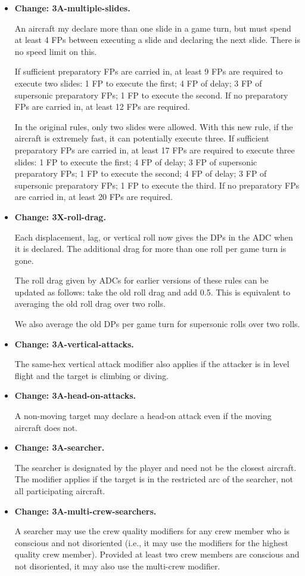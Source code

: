 \documentclass[10pt]{report}
\newcommand{\itemtag}[1]{\item \textbf{Change: #1.}\par}
\begin{document}
\begin{itemize}
    \itemtag{3A-multiple-slides} An aircraft my declare more than one slide in a game turn, but must spend at least 4 FPs between executing a slide and declaring the next slide. There is no speed limit on this.
    
    If sufficient preparatory FPs are carried in, at least 9 FPs are required to execute two slides: 1 FP to execute the first; 4 FP of delay; 3 FP of supersonic preparatory FPs; 1 FP to execute the second. If no preparatory FPs are carried in, at least 12 FPs are required.

    In the original rules, only two slides were allowed. With this new rule, if the aircraft is extremely fast, it can potentially execute three. If sufficient preparatory FPs are carried in, at least 17 FPs are required to execute three slides: 1 FP to execute the first; 4 FP of delay; 3 FP of supersonic preparatory FPs; 1 FP to execute the second; 4 FP of delay; 3 FP of supersonic preparatory FPs; 1 FP to execute the third. If no preparatory FPs are carried in, at least 20 FPs are required. 

    \itemtag{3X-roll-drag} Each displacement, lag, or vertical roll now gives the DPs in the ADC when it is declared. The additional drag for more than one roll per game turn is gone.
    
    The roll drag given by ADCs for earlier versions of these rules can be updated as follows: take the old roll drag and add 0.5. This is equivalent to averaging the old roll drag over two rolls.
    
    We also average the old DPs per game turn for supersonic rolls over two rolls.

    \itemtag{3A-vertical-attacks} The  same-hex vertical attack modifier also applies if the attacker is in level flight and the target is climbing or diving.

    \itemtag{3A-head-on-attacks} A non-moving target may declare a head-on attack even if the moving aircraft does not.
    
    \itemtag{3A-searcher} The searcher is designated by the player and need not be the closest aircraft. The  modifier applies if the target is in the restricted arc of the searcher, not all participating aircraft.
    
    \itemtag{3A-multi-crew-searchers} A searcher may use the crew quality modifiers for any crew member who is conscious and not disoriented (i.e., it may use the modifiers for the highest quality crew member). Provided at least two crew members are conscious and not disoriented, it may also use the multi-crew modifier.
    

\end{itemize}
\end{document}
